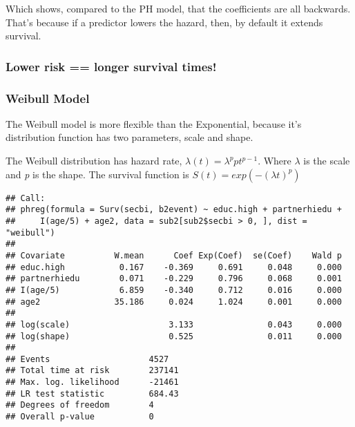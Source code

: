 \documentclass[
]{article}
\newenvironment{Shaded}{\begin{snugshade}}{\end{snugshade}}
\newcommand{\CommentTok}[1]{\textcolor[rgb]{0.56,0.35,0.01}{\textit{#1}}}
\newcommand{\DataTypeTok}[1]{\textcolor[rgb]{0.13,0.29,0.53}{#1}}
\newcommand{\DecValTok}[1]{\textcolor[rgb]{0.00,0.00,0.81}{#1}}
\newcommand{\FloatTok}[1]{\textcolor[rgb]{0.00,0.00,0.81}{#1}}
\newcommand{\KeywordTok}[1]{\textcolor[rgb]{0.13,0.29,0.53}{\textbf{#1}}}
\newcommand{\NormalTok}[1]{#1}
\newcommand{\OperatorTok}[1]{\textcolor[rgb]{0.81,0.36,0.00}{\textbf{#1}}}
\newcommand{\StringTok}[1]{\textcolor[rgb]{0.31,0.60,0.02}{#1}}
\begin{document}
Which shows, compared to the PH model, that the coefficients are all
backwards. That's because if a predictor lowers the hazard, then, by
default it extends survival.

\hypertarget{lower-risk-longer-survival-times}{%
\subsubsection{Lower risk == longer survival
times!}\label{lower-risk-longer-survival-times}}

\hypertarget{weibull-model}{%
\subsubsection{Weibull Model}\label{weibull-model}}

The Weibull model is more flexible than the Exponential, because it's
distribution function has two parameters, scale and shape.

The Weibull distribution has hazard rate,
\(\lambda(t)=\lambda^p p t^{p-1}\). Where \(\lambda\) is the scale and
\emph{p} is the shape. The survival function is
\(S(t) = exp ( -(\lambda t)^p)\)

\begin{Shaded}
\end{Shaded}

\begin{verbatim}
## Call:
## phreg(formula = Surv(secbi, b2event) ~ educ.high + partnerhiedu + 
##     I(age/5) + age2, data = sub2[sub2$secbi > 0, ], dist = "weibull")
## 
## Covariate          W.mean      Coef Exp(Coef)  se(Coef)    Wald p
## educ.high           0.167    -0.369     0.691     0.048     0.000 
## partnerhiedu        0.071    -0.229     0.796     0.068     0.001 
## I(age/5)            6.859    -0.340     0.712     0.016     0.000 
## age2               35.186     0.024     1.024     0.001     0.000 
## 
## log(scale)                    3.133               0.043     0.000 
## log(shape)                    0.525               0.011     0.000 
## 
## Events                    4527 
## Total time at risk        237141 
## Max. log. likelihood      -21461 
## LR test statistic         684.43 
## Degrees of freedom        4 
## Overall p-value           0
\end{verbatim}
\end{document}
